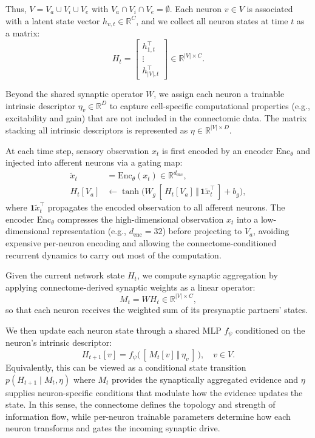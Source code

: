 \documentclass{article}
\theoremstyle{plain}
\theoremstyle{definition}
\theoremstyle{remark}
\begin{document}
Thus, $V = V_a \cup V_i \cup V_e$ with $V_a \cap V_i \cap V_e = \emptyset$. Each neuron $v \in V$ is associated with a latent state vector $h_{v,t} \in \mathbb{R}^{C}$, and we collect all neuron states at time $t$ as a matrix:
\begin{equation}
H_t = \begin{bmatrix} h_{1,t}^\top \\ \vdots \\ h_{|V|,t}^\top \end{bmatrix} \in \mathbb{R}^{|V| \times C}.
\end{equation}

Beyond the shared synaptic operator $W$, we assign each neuron a trainable intrinsic descriptor $\eta_v \in \mathbb{R}^{D}$ to capture cell-specific computational properties (e.g., excitability and gain) that are not included in the connectomic data. The matrix stacking all intrinsic descriptors is represented as $\eta \in \mathbb{R}^{|V|\times D}$.

At each time step, sensory observation $x_t$ is first encoded by an encoder $\mathrm{Enc}_\theta$ and injected into afferent neurons via a gating map:
\begin{align}
\tilde{x}_t &= \mathrm{Enc}_\theta(x_t) \in \mathbb{R}^{d_{\text{enc}}},\\
H_t[V_a] &\leftarrow \tanh\!\big(W_g\,[\,H_t[V_a] \,\Vert\, \mathbf{1}\tilde{x}_t^\top\,] + b_g\big),
\end{align}
where $\mathbf{1}\tilde{x}_t^\top$ propagates the encoded observation to all afferent neurons. The encoder $\mathrm{Enc}_\theta$ compresses the high-dimensional observation $x_t$ into a low-dimensional representation (e.g., $d_{\text{enc}}=32$) before projecting to $V_a$, avoiding expensive per-neuron encoding and allowing the connectome-conditioned recurrent dynamics to carry out most of the computation.

Given the current network state $H_t$, we compute synaptic aggregation by applying connectome-derived synaptic weights as a linear operator:
\begin{equation}
M_t = W H_t \in \mathbb{R}^{|V|\times C},
\end{equation}
so that each neuron receives the weighted sum of its presynaptic partners’ states.

We then update each neuron state through a shared MLP $f_\psi$ conditioned on the neuron’s intrinsic descriptor:
\begin{equation}
H_{t+1}[v] = f_\psi\big(\,[\,M_t[v] \,\Vert\, \eta_v\,] \,\big), \quad v\in V.
\end{equation}
Equivalently, this can be viewed as a conditional state transition $p(H_{t+1} \mid M_t, \eta)$ where $M_t$ provides the synaptically aggregated evidence and $\eta$ supplies neuron-specific conditions that modulate how the evidence updates the state. In this sense, the connectome defines the topology and strength of information flow, while per-neuron trainable parameters determine how each neuron transforms and gates the incoming synaptic drive.
\end{document}
